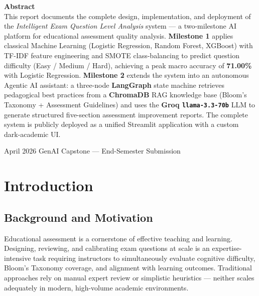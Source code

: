 \documentclass[12pt,a4paper]{article}
\begin{document}
\begin{titlepage}
  \vspace{7cm}
  \begin{goldbox}
    \centering\textbf{\large\color{gold}Abstract}\\[6pt]
    \small\color{codefg}
    This report documents the complete design, implementation, and deployment of the
    \emph{Intelligent Exam Question Level Analysis} system --- a two-milestone AI platform
    for educational assessment quality analysis. \textbf{Milestone 1} applies classical
    Machine Learning (Logistic Regression, Random Forest, XGBoost) with TF-IDF feature
    engineering and SMOTE class-balancing to predict question difficulty
    (Easy / Medium / Hard), achieving a peak macro accuracy of \textbf{71.00\%} with
    Logistic Regression. \textbf{Milestone 2} extends the system into an autonomous Agentic
    AI assistant: a three-node \textbf{LangGraph} state machine retrieves pedagogical
    best practices from a \textbf{ChromaDB} RAG knowledge base (Bloom's Taxonomy +
    Assessment Guidelines) and uses the \textbf{Groq \texttt{llama-3.3-70b}} LLM to
    generate structured five-section assessment improvement reports. The complete system is
    publicly deployed as a unified Streamlit application with a custom dark-academic UI.
  \end{goldbox}
  \vfill
  {\small\textcolor{mgray}{April 2026 \quad\textbullet\quad GenAI Capstone --- End-Semester Submission}}
\end{titlepage}

\renewcommand{\cftsecleader}{\cftdotfill{\cftdotsep}}
{\small\tableofcontents}
\newpage

\section{Introduction}

\subsection{Background and Motivation}

Educational assessment is a cornerstone of effective teaching and learning. Designing,
reviewing, and calibrating exam questions at scale is an expertise-intensive task requiring
instructors to simultaneously evaluate cognitive difficulty, Bloom's Taxonomy coverage, and
alignment with learning outcomes. Traditional approaches rely on manual expert review or
simplistic heuristics --- neither scales adequately in modern, high-volume academic
environments.
\end{document}
